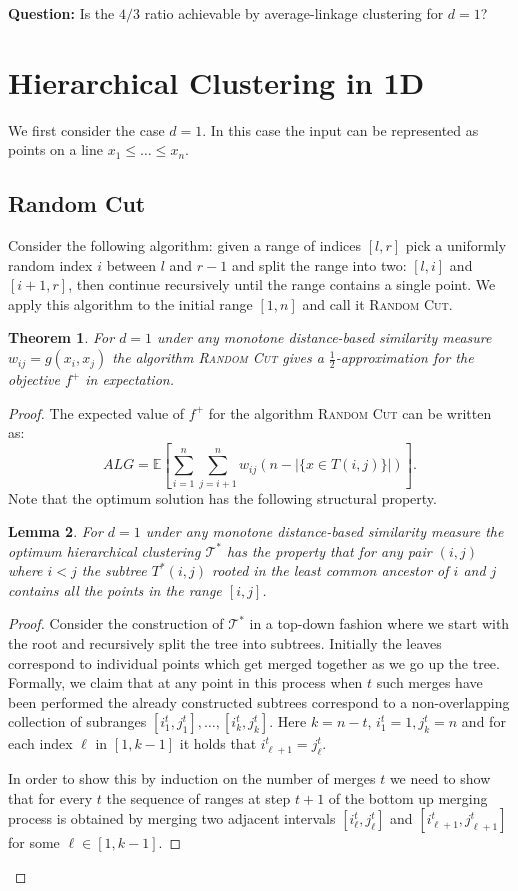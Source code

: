 \documentclass{article}
\newtheorem{theorem}{Theorem}[section]
\newtheorem{lemma}[theorem]{Lemma}
\begin{document}
\textbf{Question:} Is the $4/3$ ratio achievable by average-linkage clustering for $d = 1$?


\section{Hierarchical Clustering in 1D}
We first consider the case $d = 1$.
In this case the input can be represented as points on a line $x_1 \le \dots  \le x_n$.

\subsection{Random Cut}
Consider the following algorithm: given a range of indices $[l,r]$ pick a uniformly random index $i$ between $l$ and $r - 1$ and split the range into two: $[l, i]$ and $[i + 1, r]$, then continue recursively until the range contains a single point.
We apply this algorithm to the initial range $[1,n]$ and call it \textsc{Random Cut}.

\begin{theorem}
For $d = 1$ under any monotone distance-based similarity measure $w_{ij} = g(x_i, x_j)$ the algorithm \textsc{Random Cut} gives a $\frac12$-approximation for the objective $f^+$ in expectation.
\end{theorem}
\begin{proof}
The expected value of $f^+$ for the algorithm \textsc{Random Cut} can be written as:
$$ALG = \mathbb E\left[\sum_{i = 1}^n \sum_{j = i + 1}^n w_{ij} (n - |\{x \in T(i,j)\}|)\right].$$
Note that the optimum solution has the following structural property.
\begin{lemma}
For $d = 1$ under any monotone distance-based similarity measure the optimum hierarchical clustering $\mathcal T^*$ has the property that for any pair $(i,j)$ where $i < j$ the subtree $T^*(i,j)$ rooted in the least common ancestor of $i$ and $j$ contains all the points in the range $[i,j]$.
\end{lemma}
\begin{proof}
Consider the construction of $\mathcal T^*$ in a top-down fashion where we start with the root and recursively split the tree into subtrees.
Initially the leaves correspond to individual points which get merged together as we go up the tree.
Formally, we claim that at any point in this process when $t$ such merges have been performed the already constructed subtrees correspond to a non-overlapping collection of subranges $[i_1^t, j_1^t], \dots, [i_k^t, j_k^t]$. 
Here $k = n - t$, $i_1^t = 1, j_k^t = n$ and for each index $\ell$ in $[1, k - 1]$ it holds that $i_{\ell + 1}^t = j_\ell^t$. 

In order to show this by induction on the number of merges $t$ we need to show that for every $t$ the sequence of ranges at step $t + 1$ of the bottom up merging process is obtained by merging two adjacent intervals $[i_\ell^t, j_\ell^t]$ and $[i_{\ell + 1}^t, j_{\ell + 1}^t]$ for some $\ell \in [1, k - 1]$.
\end{proof}



\end{proof}




\end{document}
